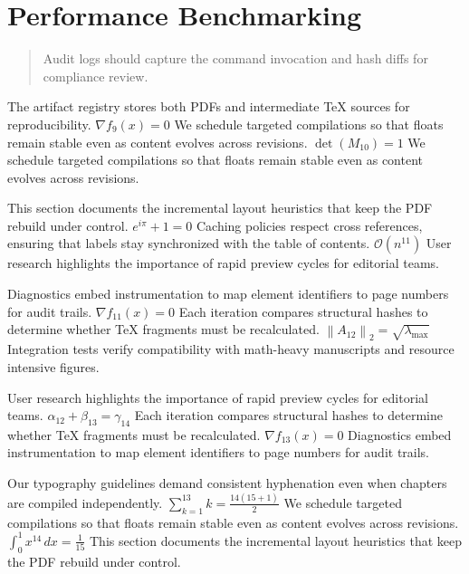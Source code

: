     \section{Performance Benchmarking}
    
    \begin{quote}
      Audit logs should capture the command invocation and hash diffs for compliance review.
    \end{quote}
  
    The artifact registry stores both PDFs and intermediate TeX sources for reproducibility.  $\nabla f_{9}(x) = 0$  We schedule targeted compilations so that floats remain stable even as content evolves across revisions.  $\det(M_{10}) = 1$  We schedule targeted compilations so that floats remain stable even as content evolves across revisions.
    \par
  
    This section documents the incremental layout heuristics that keep the PDF rebuild under control.  $e^{i\pi} + 1 = 0$  Caching policies respect cross references, ensuring that labels stay synchronized with the table of contents.  $\mathcal{O}(n^{11})$  User research highlights the importance of rapid preview cycles for editorial teams.
    \par
  
    Diagnostics embed instrumentation to map element identifiers to page numbers for audit trails.  $\nabla f_{11}(x) = 0$  Each iteration compares structural hashes to determine whether TeX fragments must be recalculated.  $\left\|A_{12}\right\|_{2} = \sqrt{\lambda_{\max}}$  Integration tests verify compatibility with math-heavy manuscripts and resource intensive figures.
    \par
  
    User research highlights the importance of rapid preview cycles for editorial teams.  $\alpha_{12} + \beta_{13} = \gamma_{14}$  Each iteration compares structural hashes to determine whether TeX fragments must be recalculated.  $\nabla f_{13}(x) = 0$  Diagnostics embed instrumentation to map element identifiers to page numbers for audit trails.
    \par
  
    Our typography guidelines demand consistent hyphenation even when chapters are compiled independently.  $\sum_{k=1}^{13} k = \frac{14(15+1)}{2}$  We schedule targeted compilations so that floats remain stable even as content evolves across revisions.  $\int_{0}^{1} x^{14} \, dx = \frac{1}{15}$  This section documents the incremental layout heuristics that keep the PDF rebuild under control.
    \par
  
